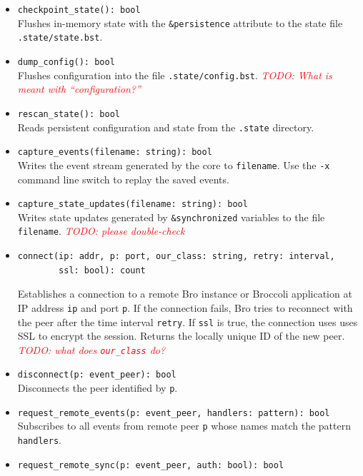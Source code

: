 \documentclass[10pt,landscape]{article}
\def\todo#1{\textit{\textcolor{red}{TODO: #1}}}
\begin{document}
\begin{multicols*}{2}
\begin{itemize}
  \item \verb|checkpoint_state(): bool|\\
    Flushes in-memory state with the \verb|&persistence| attribute to the state
    file \texttt{.state/state.bst}.
  \item \verb|dump_config(): bool|\\
    Flushes configuration into the file \texttt{.state/config.bst}.
    \todo{What is meant with ``configuration?''}
  \item \verb|rescan_state(): bool|\\
    Reads persistent configuration and state from the \texttt{.state}
    directory.
  \item \verb|capture_events(filename: string): bool|\\
    Writes the event stream generated by the core to \verb|filename|. Use the
    \texttt{-x} command line switch to replay the saved events.
  \item \verb|capture_state_updates(filename: string): bool|\\
    Writes state updates generated by \verb|&synchronized| variables to the
    file \verb|filename|. \todo{please double-check}
  \item \begin{verbatim}
connect(ip: addr, p: port, our_class: string, retry: interval,
        ssl: bool): count
\end{verbatim}
    Establishes a connection to a remote Bro instance or Broccoli application
    at IP address \verb|ip| and port \verb|p|. If the connection fails, Bro
    tries to reconnect with the peer after the time interval \verb|retry|. If
    \verb|ssl| is true, the connection uses uses SSL to encrypt the session.
    Returns the locally unique ID of the new peer.
    \todo{what does \emph{\texttt{our\_class}} do?}
  \item \verb|disconnect(p: event_peer): bool|\\
    Disconnects the peer identified by \verb|p|.
  \item \verb|request_remote_events(p: event_peer, handlers: pattern): bool|\\
    Subscribes to all events from remote peer \verb|p| whose names match the
    pattern \verb|handlers|.
  \item \verb|request_remote_sync(p: event_peer, auth: bool): bool|\\

\end{itemize}
\end{multicols*}
\end{document}
